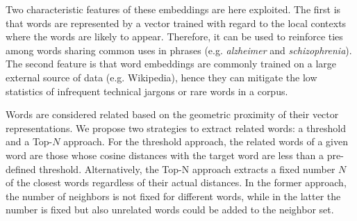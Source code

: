 \documentclass[letterpaper]{article}
\begin{document}
Two characteristic features of these embeddings are here exploited. The first is that words are represented by a vector trained with regard to the local contexts where the words are likely to appear. Therefore, it can be used to reinforce ties among words sharing common uses in phrases (e.g. \textit{alzheimer} and \textit{schizophrenia}). The second feature is that word embeddings are commonly trained on a large external source of data (e.g. Wikipedia), hence they can mitigate the low statistics of infrequent technical jargons or rare words in a corpus.

Words are considered related based on the geometric proximity of their vector representations. We propose two strategies to extract related words: a threshold and a Top-$N$ approach. For the threshold approach, the related words of a given word are those whose cosine distances with the target word are less than a pre-defined threshold. %
Alternatively, the Top-N approach extracts a fixed number $N$ of the closest words regardless of their actual distances.
In the former approach, the number of neighbors is not fixed for different words, while in the latter the number is fixed but also unrelated words could be added to the neighbor set. %


\end{document}
